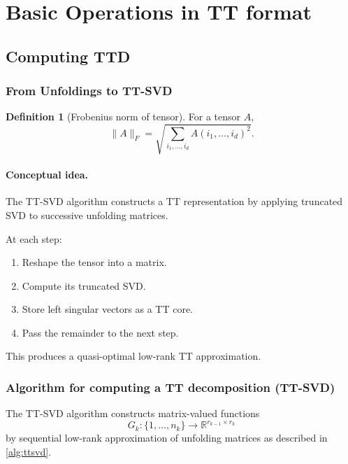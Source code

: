 \documentclass[11pt,a4paper,parskip=half-]{scrartcl}
\theoremstyle{definition}
\newtheorem{definition}{Definition}[section]
\theoremstyle{plain}
\theoremstyle{remark}
\begin{document}
\section{Basic Operations in TT format}

\subsection{Computing TTD}
\subsubsection{From Unfoldings to TT-SVD}
\begin{definition}[Frobenius norm of tensor]
  For a tensor $A$,
  \[
    \|A\|_F
    =
    \sqrt{
      \sum_{i_1,\dots,i_d}
      A(i_1,\dots,i_d)^2
    }.
  \]
\end{definition}

\paragraph{Conceptual idea.}
The TT-SVD algorithm constructs a TT representation
by applying truncated SVD to successive unfolding matrices.

At each step:

\begin{enumerate}
  \item Reshape the tensor into a matrix.
  \item Compute its truncated SVD.
  \item Store left singular vectors as a TT core.
  \item Pass the remainder to the next step.
\end{enumerate}

This produces a quasi-optimal low-rank TT approximation.

\subsubsection{Algorithm for computing a TT decomposition (TT-SVD)}

The TT-SVD algorithm constructs matrix-valued functions
\[
  G_k : \{1,\dots,n_k\} \to \mathbb{R}^{r_{k-1}\times r_k}
\]
by sequential low-rank approximation of unfolding matrices
\cite{Oseledets2011TT} as described in \cref{alg:ttsvd}.
\end{document}
